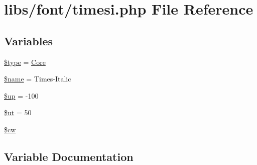 \hypertarget{timesi_8php}{}\section{libs/font/timesi.php File Reference}
\label{timesi_8php}
\subsection*{Variables}
\begin{DoxyCompactItemize}
\item 
\hyperlink{timesi_8php_a9a4a6fba2208984cabb3afacadf33919}{\$type} = \textquotesingle{}\hyperlink{class_core}{Core}\textquotesingle{}
\item 
\hyperlink{timesi_8php_ab2fc40d43824ea3e1ce5d86dee0d763b}{\$name} = \textquotesingle{}Times-\/Italic\textquotesingle{}
\item 
\hyperlink{timesi_8php_a6b5ad2ac55f9df46e8f34e78fbd6f176}{\$up} = -\/100
\item 
\hyperlink{timesi_8php_aadd3f841051043ee58e587e840e8dd0b}{\$ut} = 50
\item 
\hyperlink{timesi_8php_ac2951b03dbb0317e6c61ec920b7479dc}{\$cw}
\end{DoxyCompactItemize}


\subsection{Variable Documentation}
\hypertarget{timesi_8php_ac2951b03dbb0317e6c61ec920b7479dc}{}
